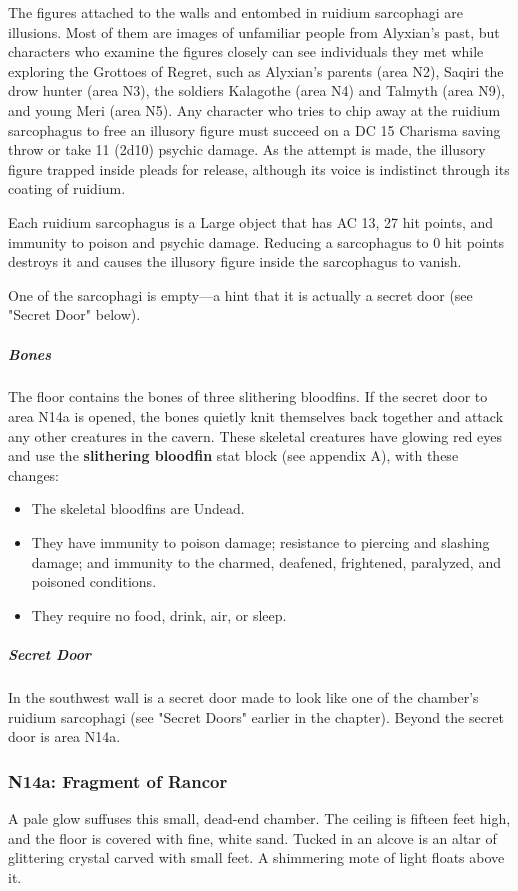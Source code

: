 \documentclass[10pt,a4paper,twoside,fancy,bg=print,twocolumn,openany,nodeprecatedcode]{dndbook}
\begin{document}
The figures attached to the walls and entombed in ruidium sarcophagi are illusions. Most of them are images of unfamiliar people from Alyxian's past, but characters who examine the figures closely can see individuals they met while exploring the Grottoes of Regret, such as Alyxian's parents (area N2), Saqiri the drow hunter (area N3), the soldiers Kalagothe (area N4) and Talmyth (area N9), and young Meri (area N5). Any character who tries to chip away at the ruidium sarcophagus to free an illusory figure must succeed on a DC 15 Charisma saving throw or take 11 (2d10) psychic damage. As the attempt is made, the illusory figure trapped inside pleads for release, although its voice is indistinct through its coating of ruidium.

Each ruidium sarcophagus is a Large object that has AC 13, 27 hit points, and immunity to poison and psychic damage. Reducing a sarcophagus to 0 hit points destroys it and causes the illusory figure inside the sarcophagus to vanish.

One of the sarcophagi is empty—a hint that it is actually a secret door (see "Secret Door" below).

\subparagraph{Bones}
The floor contains the bones of three slithering bloodfins. If the secret door to area N14a is opened, the bones quietly knit themselves back together and attack any other creatures in the cavern. These skeletal creatures have glowing red eyes and use the \textbf{slithering bloodfin} stat block (see appendix A), with these changes:


\begin{itemize}
\item The skeletal bloodfins are Undead.
\item They have immunity to poison damage; resistance to piercing and slashing damage; and immunity to the charmed, deafened, frightened, paralyzed, and poisoned conditions.
\item They require no food, drink, air, or sleep.
\end{itemize}

\subparagraph{Secret Door}
In the southwest wall is a secret door made to look like one of the chamber's ruidium sarcophagi (see "Secret Doors" earlier in the chapter). Beyond the secret door is area N14a.

\subsubsection{N14a: Fragment of Rancor}
\begin{DndReadAloud}{}
A pale glow suffuses this small, dead-end chamber. The ceiling is fifteen feet high, and the floor is covered with fine, white sand. Tucked in an alcove is an altar of glittering crystal carved with small feet. A shimmering mote of light floats above it.

\end{DndReadAloud}
\end{document}
